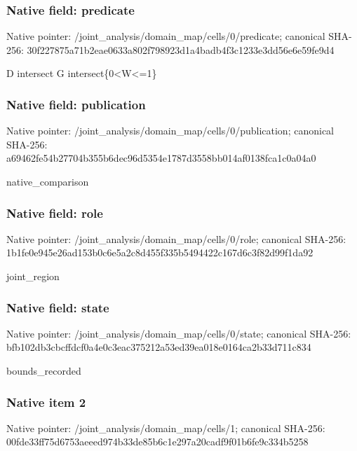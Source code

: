 \documentclass[10pt,a4paper]{article}
\begin{document}
\subsubsection{Native field: predicate}
Native pointer: /joint\_\allowbreak{}analysis/domain\_\allowbreak{}map/cells/0/predicate; canonical SHA-256: 30f227875a71b2eae0633a802f798923d1a4badb4f3c1233e3dd56e6e59fe9d4

\begingroup\raggedright\sloppy D intersect G intersect\{0<W<=\allowbreak{}1\}\par\endgroup

\subsubsection{Native field: publication}
Native pointer: /joint\_\allowbreak{}analysis/domain\_\allowbreak{}map/cells/0/publication; canonical SHA-256: a69462fe54b27704b355b6dec96d5354e1787d3558bb014af0138fca1c0a04a0

\begingroup\raggedright\sloppy native\_\allowbreak{}comparison\par\endgroup

\subsubsection{Native field: role}
Native pointer: /joint\_\allowbreak{}analysis/domain\_\allowbreak{}map/cells/0/role; canonical SHA-256: 1b1fe0e945e26ad153b0c6e5a2c8d455f335b5494422c167d6c3f82d99f1da92

\begingroup\raggedright\sloppy joint\_\allowbreak{}region\par\endgroup

\subsubsection{Native field: state}
Native pointer: /joint\_\allowbreak{}analysis/domain\_\allowbreak{}map/cells/0/state; canonical SHA-256: bfb102db3cbcffdcf0a4e0c3eac375212a53ed39ea018e0164ca2b33d711c834

\begingroup\raggedright\sloppy bounds\_\allowbreak{}recorded\par\endgroup

\subsubsection{Native item 2}
Native pointer: /joint\_\allowbreak{}analysis/domain\_\allowbreak{}map/cells/1; canonical SHA-256: 00fde33ff75d6753aeeed974b33de85b6c1e297a20cadf9f01b6fe9c334b5258
\end{document}
